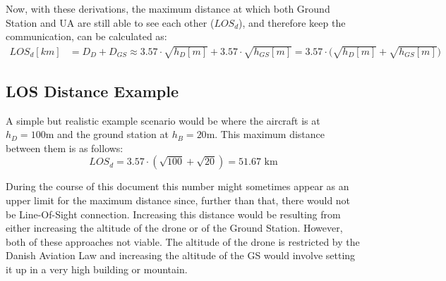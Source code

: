 Now, with these derivations, the maximum distance at which both Ground Station and UA are still able to see each other ($LOS_{d}$), and therefore keep the communication, can be calculated as:
\begin{align}
	LOS_d[km]	 &= D_D + D_{GS} \approx 3.57\cdot \sqrt{h_D[m]} + 3.57\cdot \sqrt{h_{GS}[m]} = {3.57\cdot (\sqrt{h_D[m]} + \sqrt{h_{GS}[m]}} )
\end{align}

\subsection*{LOS Distance Example}
A simple but realistic example scenario would be where the aircraft is at $h_D = 100$m and the ground station at $h_B = 20$m. This maximum distance between them is as follows:
\begin{equation*}
	LOS_d = 3.57\cdot (\sqrt{100} + \sqrt{20}) = 51.67 \text{ km}
\end{equation*}

During the course of this document this number might sometimes appear as an upper limit for the maximum distance since, further than that, there would not be Line-Of-Sight connection. Increasing this distance would be resulting from either increasing the altitude of the drone or of the Ground Station. However, both of these approaches not viable. The altitude of the drone is restricted by the Danish Aviation Law and increasing the altitude of the GS would involve setting it up in a very high building or mountain.




